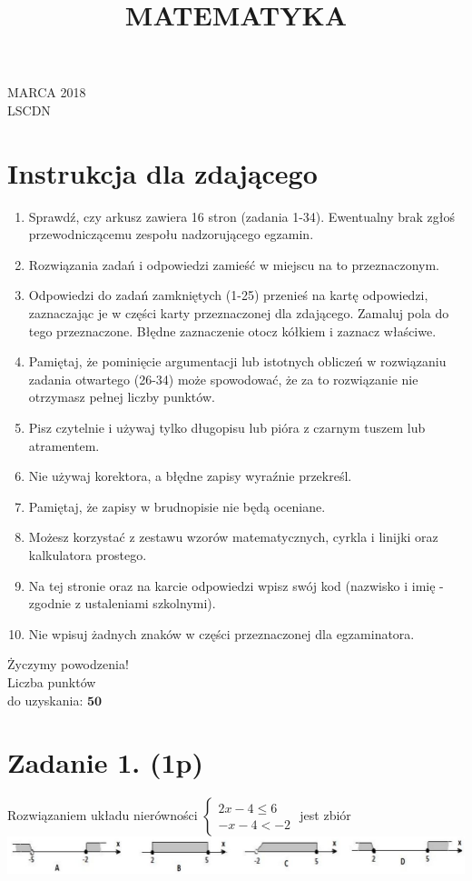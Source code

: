 \documentclass[10pt]{article}
\title{MATEMATYKA }
\author{}
\date{}
\begin{document}
 MARCA 2018\\
LSCDN

\section*{Instrukcja dla zdającego}
\begin{enumerate}
  \item Sprawdź, czy arkusz zawiera 16 stron (zadania 1-34). Ewentualny brak zgłoś przewodniczącemu zespołu nadzorującego egzamin.
  \item Rozwiązania zadań i odpowiedzi zamieść w miejscu na to przeznaczonym.
  \item Odpowiedzi do zadań zamkniętych (1-25) przenieś na kartę odpowiedzi, zaznaczając je w części karty przeznaczonej dla zdającego. Zamaluj pola do tego przeznaczone. Błędne zaznaczenie otocz kółkiem i zaznacz właściwe.
  \item Pamiętaj, że pominięcie argumentacji lub istotnych obliczeń w rozwiązaniu zadania otwartego (26-34) może spowodować, że za to rozwiązanie nie otrzymasz pełnej liczby punktów.
  \item Pisz czytelnie i używaj tylko długopisu lub pióra z czarnym tuszem lub atramentem.
  \item Nie używaj korektora, a błędne zapisy wyraźnie przekreśl.
  \item Pamiętaj, że zapisy w brudnopisie nie będą oceniane.
  \item Możesz korzystać z zestawu wzorów matematycznych, cyrkla i linijki oraz kalkulatora prostego.
  \item Na tej stronie oraz na karcie odpowiedzi wpisz swój kod (nazwisko i imię - zgodnie z ustaleniami szkolnymi).
  \item Nie wpisuj żadnych znaków w części przeznaczonej dla egzaminatora.
\end{enumerate}

Życzymy powodzenia!\\
Liczba punktów\\
do uzyskania: \(\mathbf{5 0}\)

\section*{Zadanie 1. (1p)}
Rozwiązaniem układu nierówności \(\left\{\begin{array}{c}2 x-4 \leq 6 \\ -x-4<-2\end{array}\right.\) jest zbiór\\
\includegraphics[max width=\textwidth, center]{2024_11_21_fb7e622176e162773107g-02}
\end{document}
